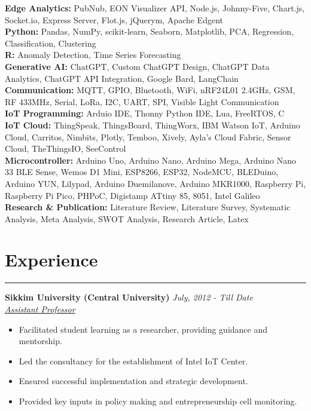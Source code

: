 \documentclass[10pt, a4paper]{article}
\begin{document}
	
		\textbf{Edge Analytics:} PubNub, EON Visualizer API, Node.js, Johnny-Five, Chart.js, Socket.io, Express Server, Flot.js, jQuerym, Apache Edgent
		\\
		\textbf{Python:} Pandas, NumPy, scikit-learn, Seaborn, Matplotlib, PCA, Regression, Classification, Clustering
		\\
		\textbf{R:} Anomaly Detection, Time Series Forecasting
		\\	
		\textbf{Generative AI:} ChatGPT, Custom ChatGPT Design, ChatGPT Data Analytics, ChatGPT API Integration, Google Bard, LangChain
		\\    	
		\textbf{Communication:} MQTT, GPIO, Bluetooth, WiFi, nRF24L01 2.4GHz, GSM, RF 433MHz, Serial, LoRa, I2C, UART, SPI, Visible Light Communication 
		\\
	\textbf{IoT Programming:} Arduio IDE, Thonny Python IDE, Lua, FreeRTOS, C
	\\	
\textbf{IoT Cloud:} ThingSpeak, ThingsBoard, ThingWorx, IBM Watson IoT, Arduino Cloud, Carritos, Nimbits, Plotly, Temboo, Xively, Ayla's Cloud Fabric, Sensor Cloud, TheThingsIO, SeeControl
		\\
\textbf{Microcontroller:} Arduino Uno, Arduino Nano, Arduino Mega, Arduino Nano 33 BLE Sense, Wemos D1 Mini, ESP8266, ESP32, NodeMCU, BLEDuino, Arduino YUN, Lilypad, Arduino Duemilanove, Arduino MKR1000, Raspberry Pi, Raspberry Pi Pico, PHPoC, Digistamp ATtiny 85, 8051, Intel Galileo \\
		\textbf{Research \& Publication:} Literature Review, Literature Survey, Systematic Analysis, Meta Analysis, SWOT Analysis, Research Article, Latex 

    
		\vspace*{-3mm}
		
	
\section*{Experience}
\vspace*{-2.5mm}
\hrule 
\vspace*{2mm}
  \noindent\textbf{Sikkim University (Central University)} \hfill \textit{July, 2012 - Till Date}\\
  \textit{\underline{Assistant Professor}} \\
  \vspace*{-4mm}
    \begin{itemize}[leftmargin=*]
	\item Facilitated student learning as a researcher, providing guidance and mentorship.
	    \vspace*{-2.5mm}
	\item Led the consultancy for the establishment of Intel IoT Center. 
	\vspace*{-2.5mm}
	\item Ensured successful implementation and strategic development.
	    \vspace*{-2.5mm}
	\item Provided key inputs in policy making and entrepreneurship cell monitoring.  
	\end{itemize}
\end{document}
